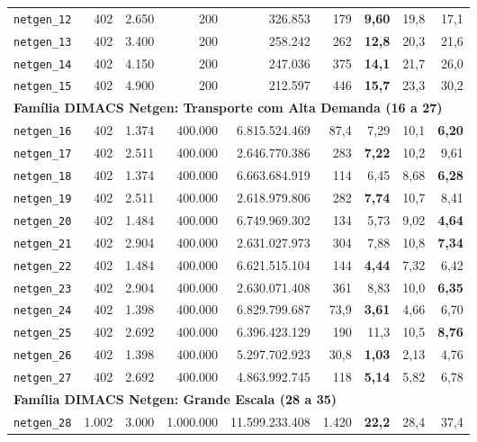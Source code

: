 \begin{longtable}{lrrrrrrrr}
\texttt{netgen\_12} & 402 & 2.650 & 200 & 326.853 & 179 & \textbf{9,60} & 19,8 & 17,1 \\
\texttt{netgen\_13} & 402 & 3.400 & 200 & 258.242 & 262 & \textbf{12,8} & 20,3 & 21,6 \\
\texttt{netgen\_14} & 402 & 4.150 & 200 & 247.036 & 375 & \textbf{14,1} & 21,7 & 26,0 \\
\texttt{netgen\_15} & 402 & 4.900 & 200 & 212.597 & 446 & \textbf{15,7} & 23,3 & 30,2 \\
\midrule
\multicolumn{9}{l}{\textbf{Família DIMACS Netgen: Transporte com Alta Demanda (16 a 27)}} \\
\midrule
\texttt{netgen\_16} & 402 & 1.374 & 400.000 & 6.815.524.469 & 87,4 & 7,29 & 10,1 & \textbf{6,20} \\
\texttt{netgen\_17} & 402 & 2.511 & 400.000 & 2.646.770.386 & 283 & \textbf{7,22} & 10,2 & 9,61 \\
\texttt{netgen\_18} & 402 & 1.374 & 400.000 & 6.663.684.919 & 114 & 6,45 & 8,68 & \textbf{6,28} \\
\texttt{netgen\_19} & 402 & 2.511 & 400.000 & 2.618.979.806 & 282 & \textbf{7,74} & 10,7 & 8,41 \\
\texttt{netgen\_20} & 402 & 1.484 & 400.000 & 6.749.969.302 & 134 & 5,73 & 9,02 & \textbf{4,64} \\
\texttt{netgen\_21} & 402 & 2.904 & 400.000 & 2.631.027.973 & 304 & 7,88 & 10,8 & \textbf{7,34} \\
\texttt{netgen\_22} & 402 & 1.484 & 400.000 & 6.621.515.104 & 144 & \textbf{4,44} & 7,32 & 6,42 \\
\texttt{netgen\_23} & 402 & 2.904 & 400.000 & 2.630.071.408 & 361 & 8,83 & 10,0 & \textbf{6,35} \\
\texttt{netgen\_24} & 402 & 1.398 & 400.000 & 6.829.799.687 & 73,9 & \textbf{3,61} & 4,66 & 6,70 \\
\texttt{netgen\_25} & 402 & 2.692 & 400.000 & 6.396.423.129 & 190 & 11,3 & 10,5 & \textbf{8,76} \\
\texttt{netgen\_26} & 402 & 1.398 & 400.000 & 5.297.702.923 & 30,8 & \textbf{1,03} & 2,13 & 4,76 \\
\texttt{netgen\_27} & 402 & 2.692 & 400.000 & 4.863.992.745 & 118 & \textbf{5,14} & 5,82 & 6,78 \\
\midrule
\multicolumn{9}{l}{\textbf{Família DIMACS Netgen: Grande Escala (28 a 35)}} \\
\midrule
\texttt{netgen\_28} & 1.002 & 3.000 & 1.000.000 & 11.599.233.408 & 1.420 & \textbf{22,2} & 28,4 & 37,4 \\

\end{longtable}
